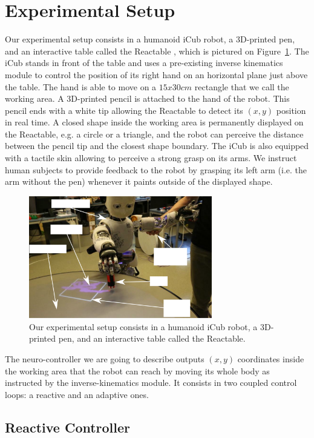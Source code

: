\documentclass[letterpaper, 10 pt, conference]{ieeeconf}  %
\begin{document}
\section{Experimental Setup}
\label{sec:setup}
Our experimental setup consists in a humanoid iCub robot, a 3D-printed pen, and an interactive table called the Reactable \cite{jorda2008stage}, which is pictured on Figure~\ref{fig:setup}. The iCub stands in front of the table and uses a pre-existing inverse kinematics module to control the position of its right hand on an horizontal plane just above the table. The hand is able to move on a $15 x 30 cm$ rectangle that we call the working area. A 3D-printed pencil is attached to the hand of the robot. This pencil ends with a white tip allowing the Reactable to detect its $(x, y)$ position in real time. A closed shape inside the working area is permanently displayed on the Reactable, e.g. a circle or a triangle, and the robot can perceive the distance between the pencil tip and the closest shape boundary. The iCub is also equipped with a tactile skin allowing to perceive a strong grasp on its arms. We instruct human subjects to provide feedback to the robot by grasping its left arm (i.e. the arm without the pen) whenever it paints outside of the displayed shape.


\begin{figure}[!t]
\centering
\includegraphics[width=8cm]{setup}
\caption{Our experimental setup consists in a humanoid iCub robot, a 3D-printed pen, and an interactive table called the Reactable.}
\label{fig:setup}
\end{figure}

The neuro-controller we are going to describe outputs $(x, y)$ coordinates inside the working area that the robot can reach by moving its whole body as instructed by the inverse-kinematics module. It consists in two coupled control loops: a reactive and an adaptive ones.

\subsection{Reactive Controller}
\end{document}
